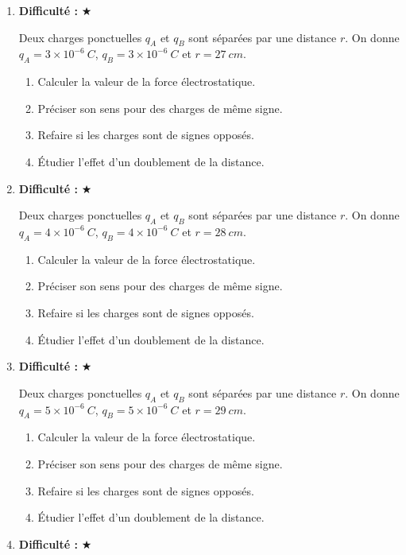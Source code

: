 \documentclass[11pt,a4paper]{article}
\newcommand{\etoiles}[1]{\textbf{Difficulté : }#1}
\begin{document}
\begin{enumerate}[label=\textbf{Exercice \arabic*.},leftmargin=*]
Deux charges ponctuelles $q_A$ et $q_B$ sont séparées par une distance $r$.
On donne $q_A=2\times 10^{-6}\ \si{C}$, $q_B=2\times 10^{-6}\ \si{C}$ et $r=26\ \si{cm}$.
\begin{enumerate}[label=\alph*)]
\item Calculer la valeur de la force électrostatique.
\item Préciser son sens pour des charges de même signe.
\item Refaire si les charges sont de signes opposés.
\item Étudier l'effet d'un doublement de la distance.
\end{enumerate}
\item \etoiles{★}

Deux charges ponctuelles $q_A$ et $q_B$ sont séparées par une distance $r$.
On donne $q_A=3\times 10^{-6}\ \si{C}$, $q_B=3\times 10^{-6}\ \si{C}$ et $r=27\ \si{cm}$.
\begin{enumerate}[label=\alph*)]
\item Calculer la valeur de la force électrostatique.
\item Préciser son sens pour des charges de même signe.
\item Refaire si les charges sont de signes opposés.
\item Étudier l'effet d'un doublement de la distance.
\end{enumerate}
\item \etoiles{★}

Deux charges ponctuelles $q_A$ et $q_B$ sont séparées par une distance $r$.
On donne $q_A=4\times 10^{-6}\ \si{C}$, $q_B=4\times 10^{-6}\ \si{C}$ et $r=28\ \si{cm}$.
\begin{enumerate}[label=\alph*)]
\item Calculer la valeur de la force électrostatique.
\item Préciser son sens pour des charges de même signe.
\item Refaire si les charges sont de signes opposés.
\item Étudier l'effet d'un doublement de la distance.
\end{enumerate}
\item \etoiles{★}

Deux charges ponctuelles $q_A$ et $q_B$ sont séparées par une distance $r$.
On donne $q_A=5\times 10^{-6}\ \si{C}$, $q_B=5\times 10^{-6}\ \si{C}$ et $r=29\ \si{cm}$.
\begin{enumerate}[label=\alph*)]
\item Calculer la valeur de la force électrostatique.
\item Préciser son sens pour des charges de même signe.
\item Refaire si les charges sont de signes opposés.
\item Étudier l'effet d'un doublement de la distance.
\end{enumerate}
\item \etoiles{★}


\end{enumerate}
\end{document}
